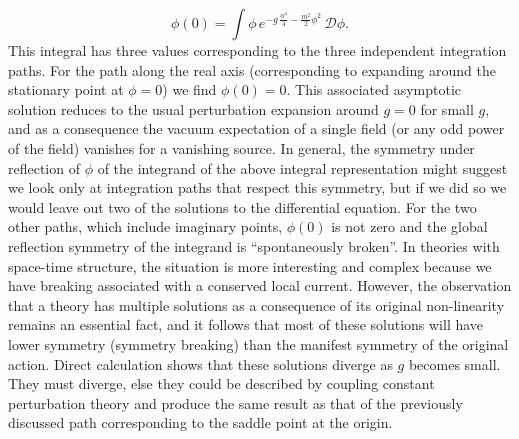 \documentclass[12pt]{article}
\begin{document}
 \begin{equation*}
      \phi(0) = \int \phi\, e^{- g\, \frac{\phi^4}{4} -
        \frac{m^2}{2}\phi^{2}}\, \mathcal{D}\phi.
    \end{equation*}
    This integral has three values corresponding to the three independent
    integration paths. For the path along the real axis (corresponding to
    expanding around the stationary point at $\phi =0$) we find
    $\phi(0)=0$. This associated asymptotic solution reduces to the usual
    perturbation expansion around $g=0$ for small $g$, and as a consequence
    the vacuum expectation of a single field (or any odd power of the field)
    vanishes for a vanishing source. In general, the symmetry under reflection
    of $\phi$ of the integrand of the above integral representation might
    suggest we look only at integration paths that respect this symmetry, but
    if we did so we would leave out two of the solutions to the differential
    equation. For the two other paths, which include imaginary points,
    $\phi(0)$ is not zero and the global reflection symmetry of the integrand
    is ``spontaneously broken''. In theories with space-time structure, the
    situation is more interesting and complex because we have breaking
    associated with a conserved local current. However, the observation that a
    theory has multiple solutions as a consequence of its original
    non-linearity remains an essential fact, and it follows that most of these
    solutions will have lower symmetry (symmetry breaking) than the manifest
    symmetry of the original action.  Direct calculation shows that these
    solutions diverge as $g$ becomes small. They must diverge, else they could
    be described by coupling constant perturbation theory and produce the same
    result as that of the previously discussed path corresponding to the
    saddle point at the origin.
\end{document}
